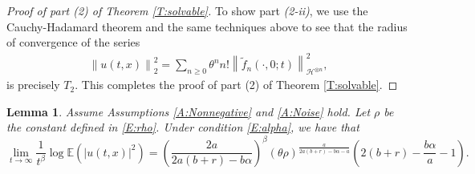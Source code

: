 \documentclass[12pt]{report}
\theoremstyle{plain}
\newtheorem{lemma}[theorem]{Lemma}
\theoremstyle{definition}
\numberwithin{equation}{section}
\newcommand{\Norm}[1]{\left\|  #1   \right\|}
\begin{document}
\begin{proof}[Proof of part (2) of Theorem \ref{T:solvable}]
	To show part \textit{(2-ii)}, we use the Cauchy-Hadamard theorem and the same techniques above to see that the radius of convergence of the series
	\begin{align*}
	\Norm{u(t,x)}_2^2 = \sum_{n \ge 0} \theta^n n! \Norm{\tilde{f}_n(\cdot,0;t)}_{ \mathcal{H}^{\otimes n }}^2,
	\end{align*}
	is precisely $T_2$. This completes the proof of part (2) of Theorem \ref{T:solvable}.
\end{proof}

\begin{lemma} \label{L:p=2}
	Assume Assumptions \ref{A:Nonnegative} and \ref{A:Noise} hold. Let $\rho$ be the constant defined
	in \eqref{E:rho}. Under condition \eqref{E:alpha}, we have that
	\begin{equation}
	\lim_{t \to \infty} \frac{1}{t^\beta} \log \mathbb{E}(|u(t,x)|^2) \nonumber
	= \left( \frac{2a}{2a(b+r)- b\alpha} \right)^\beta (\theta\rho)^{\frac{a}{2a(b+r)-b\alpha-a}}\left(2(b+r)-\frac{b\alpha}{a}-1\right).
	\end{equation}
\end{lemma}
\end{document}
